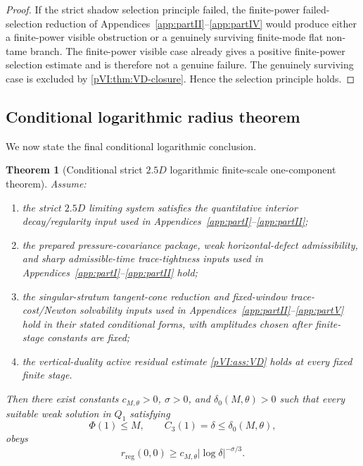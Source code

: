 \documentclass[11pt]{article}
\numberwithin{equation}{section}
\theoremstyle{plain}
\newtheorem{theorem}{Theorem}[section]
\theoremstyle{definition}
\theoremstyle{remark}
\newcommand{\reg}{\mathrm{reg}}
\begin{document}
\begin{proof}
If the strict shadow selection principle failed, the finite-power failed-selection reduction of
Appendices~\ref{app:partII}--\ref{app:partIV} would produce either a finite-power visible obstruction or a genuinely surviving
finite-mode flat non-tame branch.  The finite-power visible case already gives a positive
finite-power selection estimate and is therefore not a genuine failure.  The genuinely surviving
case is excluded by \cref{pVI:thm:VD-closure}.  Hence the selection principle holds.
\end{proof}

\subsection{Conditional logarithmic radius theorem}

We now state the final conditional logarithmic conclusion.

\begin{theorem}[Conditional strict \(2.5D\) logarithmic finite-scale one-component theorem]\label{pVI:thm:conditional-log-rate-VD}
Assume:
\begin{enumerate}[label=(\roman*)]
\item the strict \(2.5D\) limiting system satisfies the quantitative interior decay/regularity input used in Appendices~\ref{app:partI}--\ref{app:partII};
\item the prepared pressure-covariance package, weak horizontal-defect admissibility, and sharp admissible-time trace-tightness inputs used in Appendices~\ref{app:partI}--\ref{app:partII} hold;
\item the singular-stratum tangent-cone reduction and fixed-window trace-cost/Newton solvability inputs used in Appendices~\ref{app:partII}--\ref{app:partV} hold in their stated conditional forms, with amplitudes chosen after finite-stage constants are fixed;
\item the vertical-duality active residual estimate \cref{pVI:ass:VD} holds at every fixed finite stage.
\end{enumerate}
Then there exist constants \(c_{M,\theta}>0\), \(\sigma>0\), and \(\delta_0(M,\theta)>0\) such that
every suitable weak solution in \(Q_1\) satisfying
\[
        \Phi(1)\le M,
        \qquad
        C_3(1)=\delta\le\delta_0(M,\theta),
\]
obeys
\begin{equation}\label{pVI:eq:final-log-rate}
        r_{\reg}(0,0)
        \ge
        c_{M,\theta}|\log\delta|^{-\sigma/3}.
\end{equation}
\end{theorem}
\end{document}
